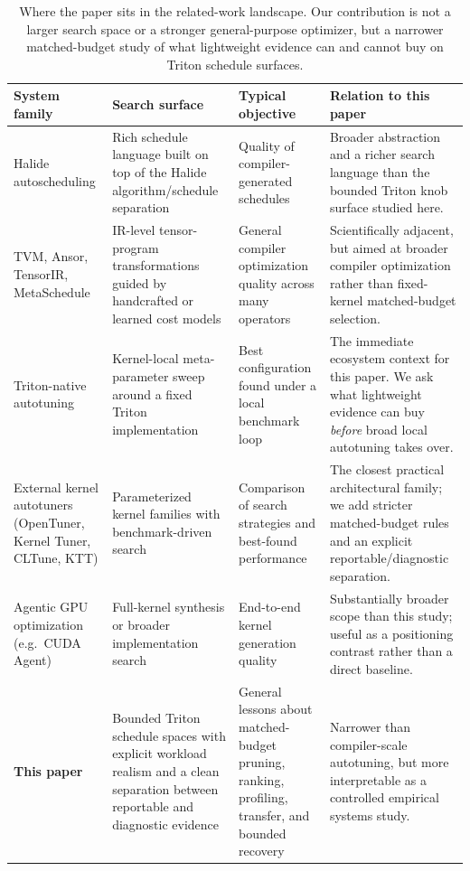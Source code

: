 \begin{table}[t]
\centering
\small
\begin{tabular}{p{}p{}p{}p{}}
\toprule
System family & Search surface & Typical objective & Relation to this paper \\
\midrule
Halide autoscheduling & Rich schedule language built on top of the Halide algorithm/schedule separation & Quality of compiler-generated schedules & Broader abstraction and a richer search language than the bounded Triton knob surface studied here. \\
TVM, Ansor, TensorIR, MetaSchedule & IR-level tensor-program transformations guided by handcrafted or learned cost models & General compiler optimization quality across many operators & Scientifically adjacent, but aimed at broader compiler optimization rather than fixed-kernel matched-budget selection. \\
Triton-native autotuning & Kernel-local meta-parameter sweep around a fixed Triton implementation & Best configuration found under a local benchmark loop & The immediate ecosystem context for this paper. We ask what lightweight evidence can buy \emph{before} broad local autotuning takes over. \\
External kernel autotuners (OpenTuner, Kernel Tuner, CLTune, KTT) & Parameterized kernel families with benchmark-driven search & Comparison of search strategies and best-found performance & The closest practical architectural family; we add stricter matched-budget rules and an explicit reportable/diagnostic separation. \\
Agentic GPU optimization (e.g.\ CUDA Agent) & Full-kernel synthesis or broader implementation search & End-to-end kernel generation quality & Substantially broader scope than this study; useful as a positioning contrast rather than a direct baseline. \\
\textbf{This paper} & Bounded Triton schedule spaces with explicit workload realism and a clean separation between reportable and diagnostic evidence & General lessons about matched-budget pruning, ranking, profiling, transfer, and bounded recovery & Narrower than compiler-scale autotuning, but more interpretable as a controlled empirical systems study. \\
\bottomrule
\end{tabular}
\caption{Where the paper sits in the related-work landscape. Our contribution is not a larger search space or a stronger general-purpose optimizer, but a narrower matched-budget study of what lightweight evidence can and cannot buy on Triton schedule surfaces.}
\label{tab:related-positioning}
\end{table}
